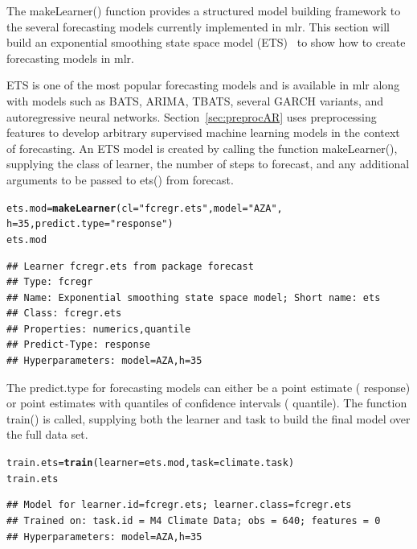 \documentclass[12pt]{article}\usepackage[]{graphicx}\usepackage[]{color}
\makeatletter
\newcommand{\hlnum}[1]{\textcolor[rgb]{0.686,0.059,0.569}{#1}}%
\newcommand{\hlstr}[1]{\textcolor[rgb]{0.192,0.494,0.8}{#1}}%
\newcommand{\hlstd}[1]{\textcolor[rgb]{0.345,0.345,0.345}{#1}}%
\newcommand{\hlkwb}[1]{\textcolor[rgb]{0.69,0.353,0.396}{#1}}%
\newcommand{\hlkwc}[1]{\textcolor[rgb]{0.333,0.667,0.333}{#1}}%
\newcommand{\hlkwd}[1]{\textcolor[rgb]{0.737,0.353,0.396}{\textbf{#1}}}%
\newenvironment{kframe}{%
 \def\at@end@of@kframe{}%
 \ifinner\ifhmode%
  \def\at@end@of@kframe{\end{minipage}}%
  \begin{minipage}{\columnwidth}%
 \fi\fi%
 \def\FrameCommand##1{\hskip\@totalleftmargin \hskip-\fboxsep
 \colorbox{shadecolor}{##1}\hskip-\fboxsep
     \hskip-\linewidth \hskip-\@totalleftmargin \hskip\columnwidth}%
 \MakeFramed {\advance\hsize-\width
   \@totalleftmargin\z@ \linewidth\hsize
   \@setminipage}}%
 {\par\unskip\endMakeFramed%
 \at@end@of@kframe}
\newenvironment{knitrout}{}{} %
\theoremstyle{definition}
\newcommand\code{\@codex}
\def\@codex#1{{\normalfont\ttfamily\hyphenchar\font=-1 #1}}
\newcommand{\pkg}[1]{{\fontseries{b}\selectfont #1}}
\makeatother
\begin{document}
The \code{makeLearner()} function provides a structured model building framework to the several forecasting models currently implemented in \pkg{mlr}. This section will build an exponential smoothing state space model (ETS)~\cite{etsMod} to show how to create forecasting models in \pkg{mlr}.

ETS is one of the most popular forecasting models and is available in \pkg{mlr} along with models such as BATS, ARIMA, TBATS, several GARCH variants, and autoregressive neural networks. Section~\ref{sec:preprocAR} uses preprocessing features to develop arbitrary supervised machine learning models in the context of forecasting. An ETS model is created by calling the function \code{makeLearner()}, supplying the class of learner, the number of steps to forecast, and any additional arguments to be passed to \code{ets()} from \pkg{forecast}. 

\singlespacing
\begin{knitrout}
\color{fgcolor}\begin{kframe}
\begin{alltt}
\hlstd{ets.mod} \hlkwb{=}\hlkwd{makeLearner}\hlstd{(}\hlkwc{cl} \hlstd{=} \hlstr{"fcregr.ets"}\hlstd{,} \hlkwc{model} \hlstd{=} \hlstr{"AZA"}\hlstd{,}
                     \hlkwc{h} \hlstd{=} \hlnum{35}\hlstd{,} \hlkwc{predict.type} \hlstd{=} \hlstr{"response"}\hlstd{)}
\hlstd{ets.mod}
\end{alltt}
\begin{verbatim}
## Learner fcregr.ets from package forecast
## Type: fcregr
## Name: Exponential smoothing state space model; Short name: ets
## Class: fcregr.ets
## Properties: numerics,quantile
## Predict-Type: response
## Hyperparameters: model=AZA,h=35
\end{verbatim}
\end{kframe}
\end{knitrout}
\doublespacing

The \code{predict.type} for forecasting models can either be a point estimate (\code{response}) or point estimates with quantiles of confidence intervals (\code{quantile}). The function \code{train()} is called, supplying both the learner and task to build the final model over the full data set.

\singlespace
\begin{knitrout}
\color{fgcolor}\begin{kframe}
\begin{alltt}
\hlstd{train.ets} \hlkwb{=} \hlkwd{train}\hlstd{(}\hlkwc{learner} \hlstd{= ets.mod,} \hlkwc{task} \hlstd{= climate.task )}
\hlstd{train.ets}
\end{alltt}
\begin{verbatim}
## Model for learner.id=fcregr.ets; learner.class=fcregr.ets
## Trained on: task.id = M4 Climate Data; obs = 640; features = 0
## Hyperparameters: model=AZA,h=35
\end{verbatim}
\end{kframe}
\end{knitrout}
\doublespace
\end{document}
